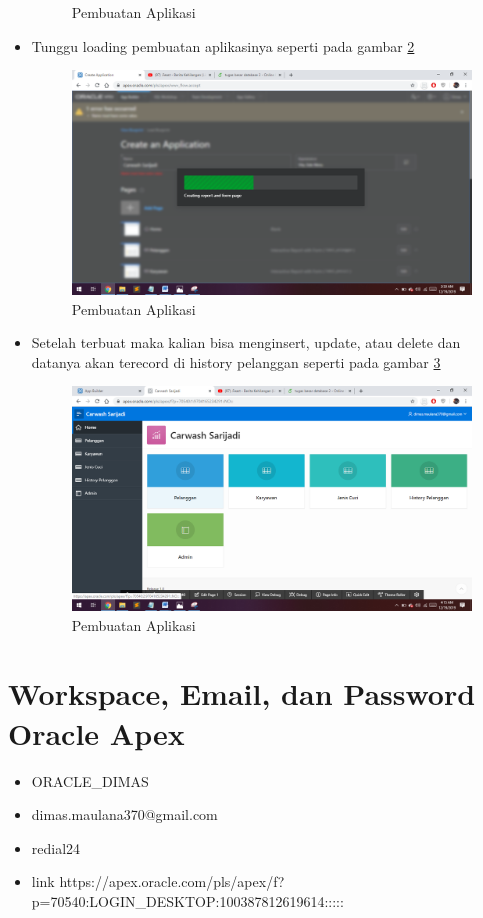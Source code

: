 \documentclass{article}
\begin{document}
\begin{itemize}
\begin{figure}[!htbp]
    \caption{Pembuatan Aplikasi}
    \label{aplikasi5}
\end{figure}
\item Tunggu loading pembuatan aplikasinya seperti pada gambar \ref{aplikasi6}
\begin{figure}[!htbp]
    \centering
    \includegraphics[scale=0.28]{figures/17.PNG}
    \caption{Pembuatan Aplikasi}
    \label{aplikasi6}
\end{figure}
\item Setelah terbuat maka kalian bisa menginsert, update, atau delete dan datanya akan terecord di history pelanggan seperti pada gambar \ref{aplikasi7}
\begin{figure}[!htbp]
    \centering
    \includegraphics[scale=0.28]{figures/18.PNG}
    \caption{Pembuatan Aplikasi}
    \label{aplikasi7}
\end{figure}
\end{itemize}

\section{Workspace, Email, dan Password Oracle Apex}
\begin{itemize}
    \item ORACLE\_DIMAS
    \item dimas.maulana370@gmail.com
    \item redial24
    \item link https://apex.oracle.com/pls/apex/f?p=70540:LOGIN\_DESKTOP:100387812619614:::::
\end{itemize}
\end{document}
